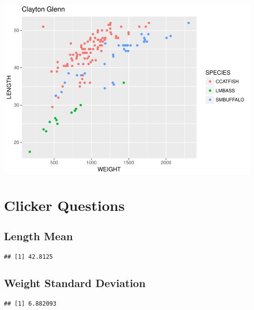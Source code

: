 \documentclass[]{article}
\newenvironment{Shaded}{\begin{snugshade}}{\end{snugshade}}
\newcommand{\KeywordTok}[1]{\textcolor[rgb]{0.13,0.29,0.53}{\textbf{#1}}}
\newcommand{\OperatorTok}[1]{\textcolor[rgb]{0.81,0.36,0.00}{\textbf{#1}}}
\newcommand{\NormalTok}[1]{#1}
\begin{document}
\includegraphics{./tex2pdf.8500/1992432b7d1bcbb7ffcb3d0766894b657da66071.pdf}

\section{Clicker Questions}\label{clicker-questions}

\subsection{Length Mean}\label{length-mean}

\begin{Shaded}
\end{Shaded}

\begin{verbatim}
## [1] 42.8125
\end{verbatim}

\subsection{Weight Standard Deviation}\label{weight-standard-deviation}

\begin{Shaded}
\end{Shaded}

\begin{verbatim}
## [1] 6.882093
\end{verbatim}
\end{document}
